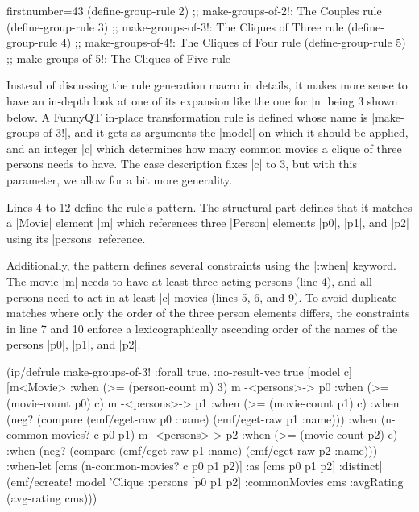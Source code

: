 \documentclass[a4paper]{article}
\newcommand{\code}{\clojureinline}
\begin{document}
\begin{clojurecode*}{firstnumber=43}
(define-group-rule 2) ;; make-groups-of-2!: The Couples rule
(define-group-rule 3) ;; make-groups-of-3!: The Cliques of Three rule
(define-group-rule 4) ;; make-groups-of-4!: The Cliques of Four rule
(define-group-rule 5) ;; make-groups-of-5!: The Cliques of Five rule
\end{clojurecode*}

Instead of discussing the rule generation macro in details, it makes more sense
to have an in-depth look at one of its expansion like the one for \code|n|
being 3 shown below.  A FunnyQT in-place transformation rule is defined whose
name is \code|make-groups-of-3!|, and it gets as arguments the \code|model| on
which it should be applied, and an integer \code|c| which determines how many
common movies a clique of three persons needs to have.  The case description
fixes \code|c| to 3, but with this parameter, we allow for a bit more
generality.

Lines 4 to 12 define the rule's pattern.  The structural part defines that it
matches a \code|Movie| element \code|m| which references three \code|Person|
elements \code|p0|, \code|p1|, and \code|p2| using its \code|persons|
reference.

Additionally, the pattern defines several constraints using the \code|:when|
keyword.  The movie \code|m| needs to have at least three acting persons (line
4), and all persons need to act in at least \code|c| movies (lines 5, 6, and
9).  To avoid duplicate matches where only the order of the three person
elements differs, the constraints in line 7 and 10 enforce a lexicographically
ascending order of the names of the persons \code|p0|, \code|p1|, and
\code|p2|.

{\renewcommand{\theFancyVerbLine}{\textcolor{blue}{\tiny\arabic{FancyVerbLine}}}
\begin{clojurecode}
(ip/defrule make-groups-of-3!
  {:forall true, :no-result-vec true}
  [model c]
  [m<Movie>          :when (>= (person-count m) 3)
   m -<persons>-> p0 :when (>= (movie-count p0) c)
   m -<persons>-> p1 :when (>= (movie-count p1) c)
                     :when (neg? (compare (emf/eget-raw p0 :name) (emf/eget-raw p1 :name)))
                     :when (n-common-movies? c p0 p1)
   m -<persons>-> p2 :when (>= (movie-count p2) c)
                     :when (neg? (compare (emf/eget-raw p1 :name) (emf/eget-raw p2 :name)))
   :when-let [cms (n-common-movies? c p0 p1 p2)]
   :as [cms p0 p1 p2] :distinct]
  (emf/ecreate! model 'Clique :persons [p0 p1 p2] :commonMovies cms
               :avgRating (avg-rating cms)))
\end{clojurecode}
}
\end{document}
